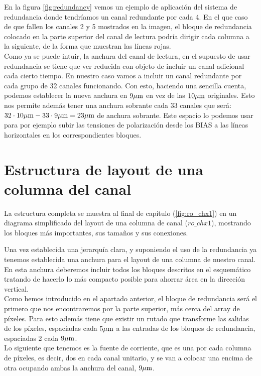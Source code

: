 En la figura \ref{fig:redundancy} vemos un ejemplo de aplicación del sistema de
redundancia donde tendríamos un canal redundante por cada 4. En el que caso de que
fallen los canales 2 y 5 mostrados en la imagen, el bloque de redundancia colocado
en la parte superior del canal de lectura podría dirigir cada columna a la siguiente,
de la forma que muestran las líneas rojas.\\

Como ya se puede intuir, la anchura del canal de lectura, en el supuesto de usar
redundancia se tiene que ver reducida con objeto de incluir un canal adicional
cada cierto tiempo. En nuestro caso vamos a incluir un canal redundante por cada
grupo de 32 canales funcionando. Con esto, haciendo una sencilla cuenta, podemos
establecer la nueva anchura en $9\mu\text{m}$ en vez de las $10\mu\text{m}$ originales. Esto nos
permite además tener una anchura sobrante cada 33 canales que será:
$32\cdot 10\mu\text{m} - 33\cdot 9\mu\text{m} = 23\mu\text{m}$ de anchura sobrante. Este espacio lo
podemos usar para por ejemplo subir las tensiones de polarización desde los BIAS
a las líneas horizontales en los correspondientes bloques.\\

\section{Estructura de layout de una columna del canal}

La estructura completa se muestra al final de capítulo (\ref{fig:ro_chx1}) en un diagrama
simplificado del layout de una columna de canal ($ro\_chx1$), mostrando los bloques más
importantes, sus tamaños y sus conexiones.

Una vez establecida una jerarquía clara, y suponiendo el uso de la redundancia ya
tenemos establecida una anchura para el layout de una columna de nuestro canal.
En esta anchura deberemos incluir todos los bloques descritos en el esquemático
tratando de hacerlo lo más compacto posible para ahorrar área en la dirección vertical.\\

Como hemos introducido en el apartado anterior, el bloque de redundancia será
el primero que nos encontraremos por la parte superior, más cerca del array de
píxeles. Para esto además tiene que existir un rutado que transforme las salidas
de los píxeles, espaciadas cada $5\mu\text{m}$ a las entradas de los bloques de redundancia,
espaciadas 2 cada $9\mu\text{m}$.\\

Lo siguiente que tenemos es la fuente de corriente, que es una por cada columna
de píxeles, es decir, dos en cada canal unitario, y se van a colocar una encima
de otra ocupando ambas la anchura del canal, $9\mu\text{m}$.\\

